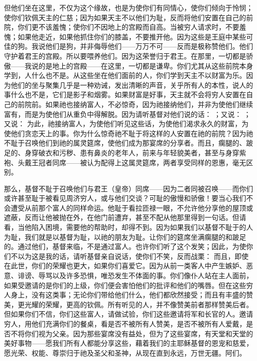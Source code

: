 但他们坐在这里，不仅为这个缘故，也是为使你们有同情心，使你们倾向于怜悯；使你们钦佩天主的仁慈；因为如果天主不以他们为耻，反而将他们安置在自己的前院，你们更不该羞愧；使你们不因地上的宫殿而自高。当被穷人请求时，不要羞愧；如果他走近，如果他抓住你们的膝盖，不要推开他。因为这些是王庭中某些可佳的狗。我说他们是狗，并非侮辱他们——万万不可——反而是极称赞他们。他们守护着君王的宫殿。所以要喂养他们。因为这荣誉归于君王。在那里，一切都是骄傲——我说的是地上的宫殿——在这里，一切都是谦卑。你们尤其从这些前院本身学到，人什么也不是。从这些坐在他们面前的人，你们学到天主不以财富为乐。因为他们的坐与聚集几乎是一种劝诫，发出清晰的声音，关乎所有人的本性，说人的事什么也不是，它们是影子和烟雾。如果财富是好事，天主就不会将穷人安置在自己的前院前。如果祂也接纳富人，不必惊奇，因为祂接纳他们，并非为使他们继续富有，而是为使他们从重负中得解脱。因为请听基督对他们说的话：  ；又说： ；又说：  为此，祂接纳富人，为使他们听见这些话，为使他们渴求永久的财富，为使他们贪恋天上的事。你为什么惊奇祂不耻于将这样的人安置在祂的前院？因为祂不耻于召唤他们到祂的属灵筵席，使他们成为那宴席的分享者。而且，瘸腿的、跛足的、身穿破衣和污秽、患有鼻炎的老年人，前来与年轻貌美者，甚至与身穿紫袍、头戴王冠者同席——被认为配得上这属灵筵席，两者享受同样的恩惠，毫无区别。\par

那么，基督不耻于召唤他们与君王（皇帝）同席——因为二者同被召唤——而你们或许甚至耻于被看见周济穷人，或与他们交谈？可耻的傲慢和骄傲！要当心我们不会遭受从前那个富人的同样命运。他耻于看拉匝禄一眼，不允许他分享他的屋顶或遮蔽，反而让他被抛在外，在他门前遭弃，甚至不配从他那里得到一句话。但请看，当他陷入困境，需要他的帮助时，却得不到。因为如果我们以基督不耻于的人为耻，我们就是以基督为耻，以祂的朋友为耻。让你们的筵席坐满瘸腿的和跛足的。通过他们，基督来临，不是通过富人。也许你们听了这个发笑；因此，为使你们不以为这是我的话，请听基督亲自说话，使你们不笑，反而战栗：  而且，即使在此世，你们的荣耀也更大，如果你们喜爱它。因为从前一类客人中产生嫉妒、恶意、诽谤、辱骂以及许多恐惧，唯恐发生不体面的事。你们像仆人站在主人面前，如果受邀请的是你们的上级，你们便会害怕他们的批评和他们的嘴唇。但在这些穷人身上，没有这类事；无论你们带给他们什么，他们都欣然接受；而且有丰盛的赞美，更光耀的荣耀，更高的钦佩。所有听见的人，并不像赞美前者那样赞美后者。但如果你们不信，你们这些富人，请做试验，你们这些邀请将军和长官的人。邀请穷人，用他们充满你们的餐桌，看是否不被所有人赞美，是否不被所有人爱戴，是否不将你们视为父亲。因为那些宴席没有益处，但为了这些宴席，有天堂和天堂的美好事物——愿我们所有人都能分享这些，藉着我们的主耶稣基督的恩宠和慈爱，愿光荣、权能、尊崇归于祂及圣父和圣神，从现在直到永远，万世无疆。阿们。\par

